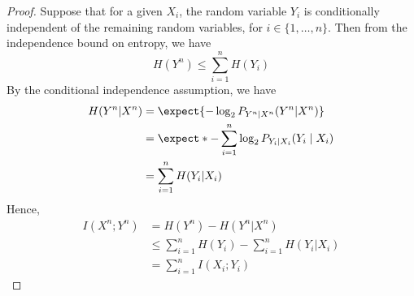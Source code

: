 \documentclass[
  coursecode={MTHE 474},
  assignmentname={Homework \homeworknumber},
  studentnumber=20053722,
  name={Bryan Hoang}
]{
  ltxanswer%
}
\begin{document}
\begin{questions}
\begin{solution}
\begin{parts}
\begin{subparts}
          \subpart{}
          \begin{proof}
            Suppose that for a given \(X_{i}\), the random variable \(Y_{i}\) is conditionally independent of the remaining random variables, for \(i \in \{1,\dotsc,n\}\). Then from the independence bound on entropy, we have
            \begin{equation}\label{eq:independencebound}
              H(Y^{n}) \le \sum_{i=1}^n H(Y_{i})
            \end{equation}
            By the conditional independence assumption, we have
            \begin{align*}
              H(Y^{n}|X^{n}) &= \expect{-\log_{2}P_{Y^{n}|X^{n}}(Y^{n}|X^{n})}                            \\
                             &= \expect*{- \sum_{i=1}^{n} \log_{2}P_{Y_{i}\mid{}X_{i}}(Y_{i}\mid{}X_{i})} \\
                             &= \sum_{i=1}^{n} H(Y_{i}|X_{i})
            \end{align*}
            Hence,
            \begin{align*}
              I(X^{n};Y^{n}) &= H(Y^{n}) - H(Y^{n}|X^{n})                               \\
                             &\le \sum_{i=1}^n H(Y_{i}) - \sum_{i=1}^{n} H(Y_{i}|X_{i}) \\
                             &= \sum_{i=1}^n I(X_{i};Y_{i})
            \end{align*}
          \end{proof}
        \end{subparts}
      \end{parts}
    \end{solution}
  \end{questions}
\end{document}
